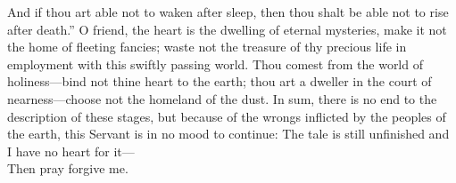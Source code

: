 \documentclass[12pt]{article}
\begin{document}
\vspace{2ex}
 {
And if thou art able not to waken after sleep, then thou shalt be able not to rise after death.''
}
\vspace{2ex}
 {
O friend, the heart is the dwelling of eternal mysteries,
}
\vspace{2ex}
 {
make it not the home of fleeting fancies; waste not the treasure of thy precious life in employment with this swiftly passing world.
}
\vspace{2ex}
 {
Thou comest from the world of holiness---bind not thine heart to the earth;
}
\vspace{2ex}
 {
thou art a dweller in the court of nearness---choose not the homeland of the dust.
}
\vspace{2ex}
 {
In sum, there is no end to the description of these stages,
}
\vspace{2ex}
 {
but because of the wrongs inflicted by the peoples of the earth, this Servant is in no mood to continue:
}
\vspace{2ex}
 {
The tale is still unfinished and I have no heart for it--- \\
Then pray forgive me.\footnotemark[16]
}
\end{document}
